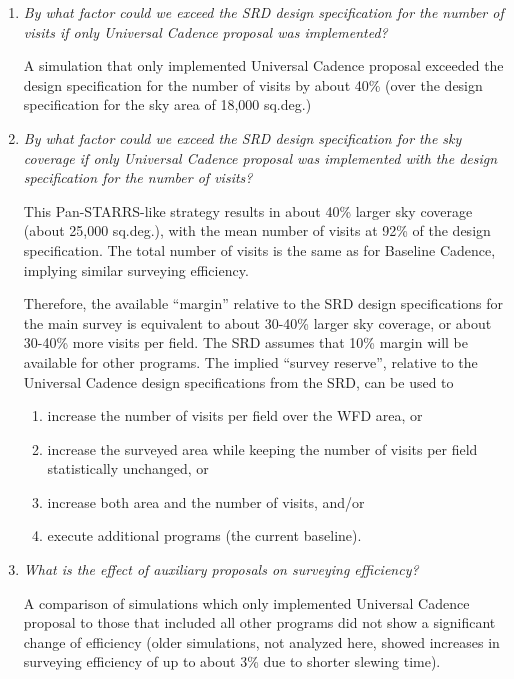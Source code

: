\documentclass[manuscript]{article}
\begin{document}
\begin{enumerate} 
\item {\it By what factor could we exceed the SRD design specification for the number
of visits if only Universal Cadence proposal was implemented?} 

A simulation that only implemented Universal Cadence proposal exceeded 
the design specification for the number of visits by about 40\% (over the design 
specification for the sky area of 18,000 sq.deg.)

\item {\it By what factor could we exceed the SRD design specification for the
sky coverage if only Universal Cadence proposal was implemented
with the design specification for the number of visits? } 

This Pan-STARRS-like strategy results in about 40\% larger sky coverage 
(about 25,000 sq.deg.), with the mean number of visits at 92\% of the design
specification. The total number of visits is the same as for Baseline
Cadence, implying similar surveying efficiency. 

Therefore, the available ``margin'' relative to the SRD design specifications
for the main survey is equivalent to about 30-40\% larger sky coverage, or 
about 30-40\% more visits per field. The SRD assumes that 10\% margin
will be available for other programs. The implied ``survey reserve'', 
relative to the Universal Cadence design specifications from the SRD, can 
be used to
\begin{enumerate}
\item increase the number of visits per field over the WFD area,  or 
\item increase the surveyed area while keeping the number of visits per field statistically unchanged, or 
\item increase both area and the number of visits, and/or  
\item execute additional programs (the current baseline). 
\end{enumerate} 


\item {\it What is the effect of auxiliary proposals on surveying efficiency?}

A comparison of simulations which only implemented Universal Cadence 
proposal to those that included all other programs did not show a significant
change of efficiency (older simulations, not analyzed here, showed
increases in surveying efficiency of up to about 3\% due to shorter slewing 
time).



\end{enumerate}
\end{document}

